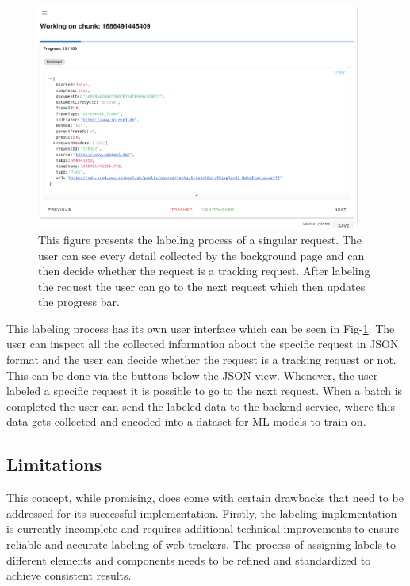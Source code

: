 \begin{figure}
  \begin{center}
    \includegraphics[width=0.95\textwidth]{images/Labeling.png}
  \end{center}
  \caption{This figure presents the labeling process of a singular request. The user can see every detail collected by the 
  background page and can then decide whether the request is a tracking request. After labeling the request the user can 
  go to the next request which then updates the progress bar.
}
  \label{fig:Labeling}
\end{figure}


This labeling process has its own user interface which can be seen in Fig-\ref{fig:Labeling}. The user can inspect all the collected information
about the specific request in JSON format and the user can decide whether the request is a tracking request or not. This can be done via 
the buttons below the JSON view. Whenever, the user labeled a specific request it is possible to go to the next request. When a batch is
completed the user can send the labeled data to the backend service, where this data gets collected and encoded into a dataset for ML
models to train on. 

\subsection{Limitations}
\label{sec:lim}

This concept, while promising, does come with certain drawbacks that need to be addressed for its successful implementation.
Firstly, the labeling implementation is currently incomplete and requires additional technical improvements to ensure reliable
and accurate labeling of web trackers. The process of assigning labels to different elements and components needs to be refined
and standardized to achieve consistent results.

